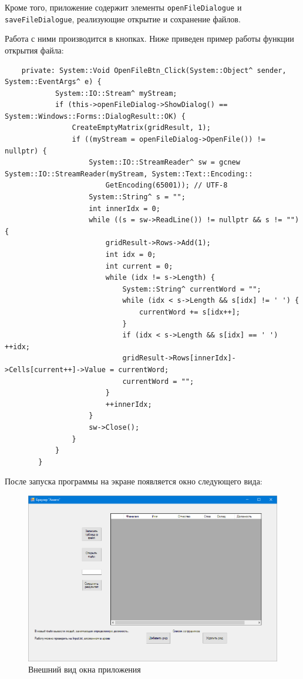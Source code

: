 Кроме того, приложение содержит элементы \verb|openFileDialogue|
и \verb|saveFileDialogue|, реализующие открытие и сохранение файлов.

Работа с ними производится в кнопках. Ниже приведен пример работы
функции открытия файла:

\begin{verbatim}
    private: System::Void OpenFileBtn_Click(System::Object^ sender, System::EventArgs^ e) {
			System::IO::Stream^ myStream;
			if (this->openFileDialog->ShowDialog() == System::Windows::Forms::DialogResult::OK) {
				CreateEmptyMatrix(gridResult, 1);
				if ((myStream = openFileDialog->OpenFile()) != nullptr) {
					System::IO::StreamReader^ sw = gcnew System::IO::StreamReader(myStream, System::Text::Encoding::
						GetEncoding(65001)); // UTF-8
					System::String^ s = "";
					int innerIdx = 0;
					while ((s = sw->ReadLine()) != nullptr && s != "") {
						gridResult->Rows->Add(1);
						int idx = 0;
						int current = 0;
						while (idx != s->Length) { 
							System::String^ currentWord = "";
							while (idx < s->Length && s[idx] != ' ') {
								currentWord += s[idx++];
							}
							if (idx < s->Length && s[idx] == ' ') ++idx;
							gridResult->Rows[innerIdx]->Cells[current++]->Value = currentWord;
							currentWord = "";
						}
						++innerIdx;
					}
					sw->Close();
				}
			}
		}
\end{verbatim}

После запуска программы на экране появляется окно следующего вида:
\begin{figure}[H]
    \centering
    \includegraphics[scale=0.4]{task8/exec.png}
    \caption{Внешний вид окна приложения}
\end{figure}

